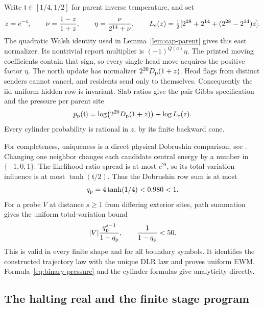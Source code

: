 Write \(\mathfrak t\in[1/4,1/2]\) for parent inverse temperature, and set
\[
 z=e^{-\mathfrak t},\qquad \nu=\frac{1-z}{1+z},\qquad
 \eta=\frac{\nu}{2^{14}+\nu},\qquad
 L_{\rm e}(z)=\tfrac12[2^{28}+2^{14}+(2^{28}-2^{14})z].
\]
The quadratic Walsh identity used in Lemma~\ref{lem:cap-parent} gives this east normalizer. Its nontrivial report multiplier is \((-1)^{Q(a)}\eta\). The printed moving coefficients contain that sign, so every single-head move acquires the positive factor \(\eta\). The north update has normalizer \(2^{20}D_{\rm p}(1+z)\). Head flags from distinct senders cannot cancel, and residents send only to themselves. Consequently the iid uniform hidden row is invariant. Slab ratios give the pair Gibbs specification and the pressure per parent site
\begin{equation}\label{eq:binary-pressure}
 p_{\rm p}(\mathfrak t)=\log\bigl(2^{20}D_{\rm p}(1+z)\bigr)+\log L_{\rm e}(z).
\end{equation}
Every cylinder probability is rational in \(z\), by its finite backward cone.

For completeness, uniqueness is a direct physical Dobrushin comparison; see \cite[Section~2.3]{rebeschiniVanHandel}. Changing one neighbor changes each candidate central energy by a number in \(\{-1,0,1\}\). The likelihood-ratio spread is at most \(e^{2\mathfrak t}\), so its total-variation influence is at most \(\tanh(\mathfrak t/2)\). Thus the Dobrushin row sum is at most
\[
 q_{\rm p}=4\tanh(1/4)<0.980<1.
\]
For a probe \(V\) at distance \(s\ge1\) from differing exterior sites, path summation gives the uniform total-variation bound
\begin{equation}\label{eq:parent-comparison}
 |V|\frac{q_{\rm p}^{s-1}}{1-q_{\rm p}},\qquad
 \frac1{1-q_{\rm p}}<50.
\end{equation}
This is valid in every finite shape and for all boundary symbols. It identifies the constructed trajectory law with the unique DLR law and proves uniform EWM. Formula~\eqref{eq:binary-pressure} and the cylinder formulas give analyticity directly.

\subsection{The halting real and the finite stage program}\label{sec:binary-halting}

